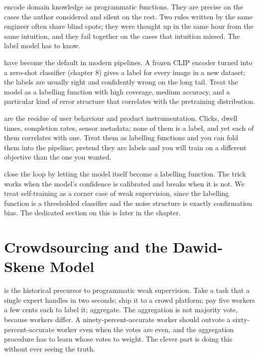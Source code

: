  encode domain knowledge as programmatic functions. They are precise on the cases the author considered and silent on the rest. Two rules written by the same engineer often share blind spots; they were thought up in the same hour from the same intuition, and they fail together on the cases that intuition missed. The label model has to know.

 have become the default in modern pipelines. A frozen CLIP encoder turned into a zero-shot classifier (chapter 8) gives a label for every image in a new dataset; the labels are usually right and confidently wrong on the long tail. Treat the model as a labelling function with high coverage, medium accuracy, and a particular kind of error structure that correlates with the pretraining distribution.

 are the residue of user behaviour and product instrumentation. Clicks, dwell times, completion rates, sensor metadata; none of them is a label, and yet each of them correlates with one. Treat them as labelling functions and you can fold them into the pipeline; pretend they are labels and you will train on a different objective than the one you wanted.

 close the loop by letting the model itself become a labelling function. The trick works when the model's confidence is calibrated and breaks when it is not. We treat self-training as a corner case of weak supervision, since the labelling function is a thresholded classifier and the noise structure is exactly confirmation bias. The dedicated section on this is later in the chapter.


\newpage
\section{Crowdsourcing and the Dawid-Skene Model}


 is the historical precursor to programmatic weak supervision. Take a task that a single expert handles in two seconds; ship it to a crowd platform; pay five workers a few cents each to label it; aggregate. The aggregation is not majority vote, because workers differ. A ninety-percent-accurate worker should outvote a sixty-percent-accurate worker even when the votes are even, and the aggregation procedure has to learn whose votes to weight. The clever part is doing this without ever seeing the truth.

